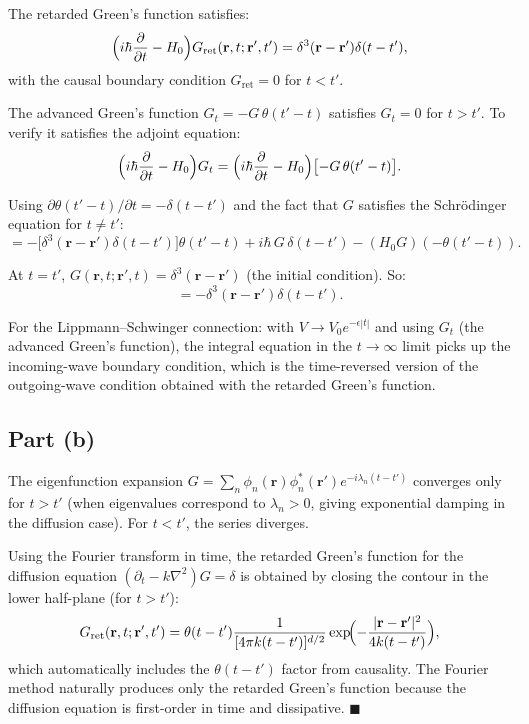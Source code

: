 \documentclass[12pt]{article}
\begin{document}
The retarded Green's function satisfies:
\[
\Bigl(i\hbar\frac{\partial}{\partial t} - H_0\Bigr)G_{\mathrm{ret}}(\mathbf{r},t;\mathbf{r}',t') = \delta^3(\mathbf{r}-\mathbf{r}')\delta(t-t'),
\]
with the causal boundary condition $G_{\mathrm{ret}} = 0$ for $t < t'$.

The advanced Green's function $G_t = -G\,\theta(t'-t)$ satisfies $G_t = 0$ for $t > t'$. To verify it satisfies the adjoint equation:
\[
\Bigl(i\hbar\frac{\partial}{\partial t} - H_0\Bigr)G_t = \Bigl(i\hbar\frac{\partial}{\partial t} - H_0\Bigr)\bigl[-G\,\theta(t'-t)\bigr].
\]

Using $\partial\theta(t'-t)/\partial t = -\delta(t-t')$ and the fact that $G$ satisfies the Schr\"odinger equation for $t \neq t'$:
\[
= -\bigl[\delta^3(\mathbf{r}-\mathbf{r}')\delta(t-t')\bigr]\theta(t'-t) + i\hbar\,G\,\delta(t-t') - (H_0 G)(-\theta(t'-t)).
\]

At $t = t'$, $G(\mathbf{r},t;\mathbf{r}',t) = \delta^3(\mathbf{r}-\mathbf{r}')$ (the initial condition). So:
\[
= -\delta^3(\mathbf{r}-\mathbf{r}')\delta(t-t').
\]

For the Lippmann--Schwinger connection: with $V \to V_0 e^{-\epsilon|t|}$ and using $G_t$ (the advanced Green's function), the integral equation in the $t\to\infty$ limit picks up the incoming-wave boundary condition, which is the time-reversed version of the outgoing-wave condition obtained with the retarded Green's function.

\subsection*{Part (b)}

The eigenfunction expansion $G = \sum_n \phi_n(\mathbf{r})\phi_n^*(\mathbf{r}')e^{-i\lambda_n(t-t')}$ converges only for $t > t'$ (when eigenvalues correspond to $\lambda_n > 0$, giving exponential damping in the diffusion case). For $t < t'$, the series diverges.

Using the Fourier transform in time, the retarded Green's function for the diffusion equation $(\partial_t - k\nabla^2)G = \delta$ is obtained by closing the contour in the lower half-plane (for $t > t'$):
\[
G_{\mathrm{ret}}(\mathbf{r},t;\mathbf{r}',t') = \theta(t-t')\frac{1}{[4\pi k(t-t')]^{d/2}}\exp\!\Bigl(-\frac{|\mathbf{r}-\mathbf{r}'|^2}{4k(t-t')}\Bigr),
\]
which automatically includes the $\theta(t-t')$ factor from causality. The Fourier method naturally produces only the retarded Green's function because the diffusion equation is first-order in time and dissipative. $\blacksquare$
\end{document}
